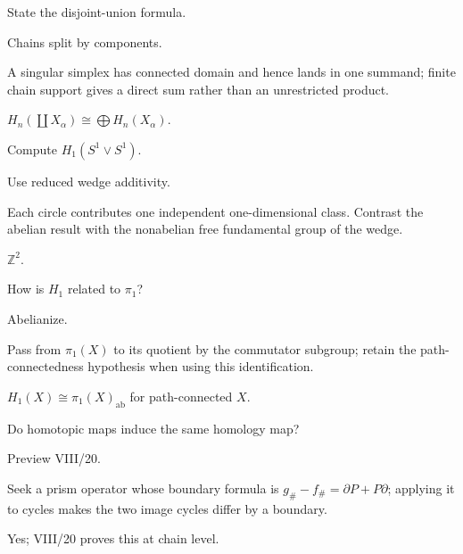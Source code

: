 \begin{exercise}\label{exr:viii17-20}
State the disjoint-union formula.
\end{exercise}
\begin{hint}
Chains split by components.

A singular simplex has connected domain and hence lands in one summand; finite chain support gives a direct sum rather than an unrestricted product.
\end{hint}
\begin{solution}
\(H_n(\coprod X_\alpha)\cong\bigoplus H_n(X_\alpha)\).
\end{solution}

\begin{exercise}\label{exr:viii17-21}
Compute \(H_1(S^1\vee S^1)\).
\end{exercise}
\begin{hint}
Use reduced wedge additivity.

Each circle contributes one independent one-dimensional class. Contrast the abelian result with the nonabelian free fundamental group of the wedge.
\end{hint}
\begin{solution}
\(\mathbb Z^2\).
\end{solution}

\begin{exercise}\label{exr:viii17-22}
How is \(H_1\) related to \(\pi_1\)?
\end{exercise}
\begin{hint}
Abelianize.

Pass from \(\pi_1(X)\) to its quotient by the commutator subgroup; retain the path-connectedness hypothesis when using this identification.
\end{hint}
\begin{solution}
\(H_1(X)\cong\pi_1(X)_{\mathrm{ab}}\) for path-connected \(X\).
\end{solution}

\begin{exercise}\label{exr:viii17-23}
Do homotopic maps induce the same homology map?
\end{exercise}
\begin{hint}
Preview VIII/20.

Seek a prism operator whose boundary formula is \(g_\#-f_\#=\partial P+P\partial\); applying it to cycles makes the two image cycles differ by a boundary.
\end{hint}
\begin{solution}
Yes; VIII/20 proves this at chain level.
\end{solution}

